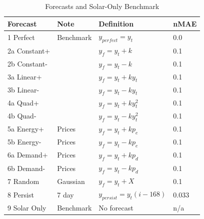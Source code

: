 \documentclass[conference]{IEEEtran}
\begin{document}
\begin{table}[t]
    \centering
    \caption{Forecasts and Solar-Only Benchmark}
    \label{tab:forecasts}
    \setlength{\tabcolsep}{9pt}
    \begin{tabular}{l l l l}
        Forecast               & Note                             & Definition & nMAE \\
        \hline
        \hline
        1 Perfect & Benchmark &  \(y_{perfect} = y_t\)        & 0.0               \\
        \hline
        2a Constant+ &             & \(y_f = y_t + k\)           & 0.1               \\
        2b Constant-  &            &  \(y_f = y_t - k\)           & 0.1               \\
        \hline
        3a Linear+     &           &  \(y_f = y_t + ky_t\)        & 0.1               \\
        3b Linear-      &          &  \(y_f = y_t - ky_t\)        & 0.1               \\
        \hline
        4a Quad+         &         &  \(y_f = y_t + ky_t^2\)      & 0.1               \\
        4b Quad-          &        &  \(y_f = y_t - ky_t^2\)      & 0.1               \\
        \hline
        5a Energy+ &Prices       &  \(y_f = y_t + kp_e\)        & 0.1               \\
        5b Energy- &Prices       &  \(y_f = y_t - kp_e\)        & 0.1               \\
        \hline
        6a Demand+ &Prices       &  \(y_f = y_t + kp_d\)        & 0.1               \\
        6b Demand- &Prices       &  \(y_f = y_t - kp_d\)        & 0.1               \\
        \hline
        7 Random &Gaussian      &  \(y_f = y_t + X\)            & 0.1               \\
        \hline
        8 Persist & 7 day               &  \(y_{persist} = y_t(i-168)\) & 0.033             \\
        \hline
        \hline
        9 Solar Only & Benchmark &  No forecast                  & n/a               \\
        \hline
    \end{tabular}
\end{table}
\end{document}
